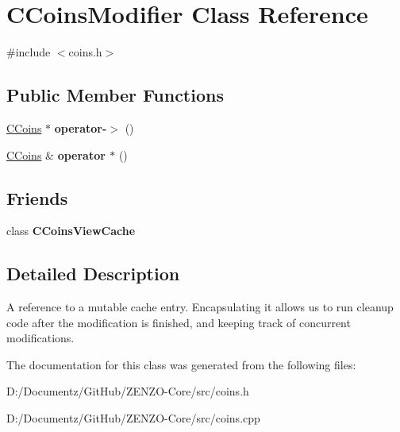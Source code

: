\hypertarget{class_c_coins_modifier}{}\section{C\+Coins\+Modifier Class Reference}
\label{class_c_coins_modifier}


{\ttfamily \#include $<$coins.\+h$>$}

\subsection*{Public Member Functions}
\begin{DoxyCompactItemize}
\item 
\mbox{\label{class_c_coins_modifier_a5831f586921460e6ec26635cb92c12f6}} 
\mbox{\hyperlink{class_c_coins}{C\+Coins}} $\ast$ {\bfseries operator-\/$>$} ()
\item 
\mbox{\label{class_c_coins_modifier_aaa40fd42e6f8a7286617b80743adc52f}} 
\mbox{\hyperlink{class_c_coins}{C\+Coins}} \& {\bfseries operator $\ast$} ()
\end{DoxyCompactItemize}
\subsection*{Friends}
\begin{DoxyCompactItemize}
\item 
\mbox{\label{class_c_coins_modifier_a1a8530a17e2e3f56e97217784400ee46}} 
class {\bfseries C\+Coins\+View\+Cache}
\end{DoxyCompactItemize}


\subsection{Detailed Description}
A reference to a mutable cache entry. Encapsulating it allows us to run cleanup code after the modification is finished, and keeping track of concurrent modifications. 

The documentation for this class was generated from the following files\+:\begin{DoxyCompactItemize}
\item 
D\+:/\+Documentz/\+Git\+Hub/\+Z\+E\+N\+Z\+O-\/\+Core/src/coins.\+h\item 
D\+:/\+Documentz/\+Git\+Hub/\+Z\+E\+N\+Z\+O-\/\+Core/src/coins.\+cpp\end{DoxyCompactItemize}
